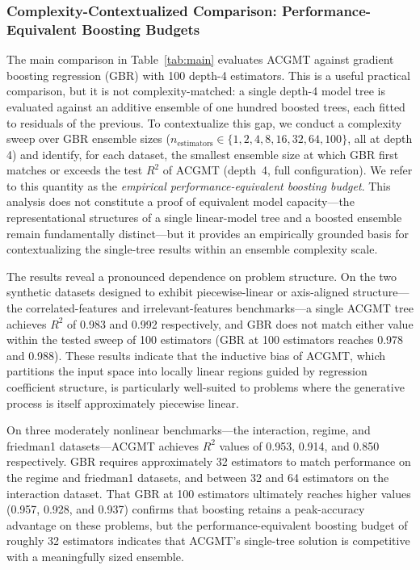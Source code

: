 \documentclass[11pt,a4paper]{article}
\begin{document}
\subsubsection{Complexity-Contextualized Comparison: Performance-Equivalent Boosting Budgets}

The main comparison in Table~\ref{tab:main} evaluates ACGMT against gradient boosting regression (GBR) with 100 depth-4 estimators. This is a useful practical comparison, but it is not complexity-matched: a single depth-4 model tree is evaluated against an additive ensemble of one hundred boosted trees, each fitted to residuals of the previous. To contextualize this gap, we conduct a complexity sweep over GBR ensemble sizes ($n_{\text{estimators}} \in \{1, 2, 4, 8, 16, 32, 64, 100\}$, all at depth 4) and identify, for each dataset, the smallest ensemble size at which GBR first matches or exceeds the test $R^2$ of ACGMT (depth~4, full configuration). We refer to this quantity as the \emph{empirical performance-equivalent boosting budget}. This analysis does not constitute a proof of equivalent model capacity---the representational structures of a single linear-model tree and a boosted ensemble remain fundamentally distinct---but it provides an empirically grounded basis for contextualizing the single-tree results within an ensemble complexity scale.

The results reveal a pronounced dependence on problem structure. On the two synthetic datasets designed to exhibit piecewise-linear or axis-aligned structure---the correlated-features and irrelevant-features benchmarks---a single ACGMT tree achieves $R^2$ of 0.983 and 0.992 respectively, and GBR does not match either value within the tested sweep of 100 estimators (GBR at 100 estimators reaches 0.978 and 0.988). These results indicate that the inductive bias of ACGMT, which partitions the input space into locally linear regions guided by regression coefficient structure, is particularly well-suited to problems where the generative process is itself approximately piecewise linear.

On three moderately nonlinear benchmarks---the interaction, regime, and friedman1 datasets---ACGMT achieves $R^2$ values of 0.953, 0.914, and 0.850 respectively. GBR requires approximately 32 estimators to match performance on the regime and friedman1 datasets, and between 32 and 64 estimators on the interaction dataset. That GBR at 100 estimators ultimately reaches higher values (0.957, 0.928, and 0.937) confirms that boosting retains a peak-accuracy advantage on these problems, but the performance-equivalent boosting budget of roughly 32 estimators indicates that ACGMT's single-tree solution is competitive with a meaningfully sized ensemble.
\end{document}
